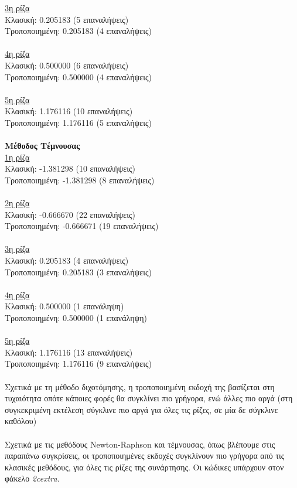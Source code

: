 \documentclass[a4paper, 14pt]{article}   %
\begin{document}
\underline{3η ρίζα}\\
Κλασική: 0.205183 (5 επαναλήψεις)\\
Τροποποιημένη: 0.205183 (4 επαναλήψεις)\\\\
\underline{4η ρίζα}\\
Κλασική: 0.500000 (6 επαναλήψεις)\\
Τροποποιημένη: 0.500000 (4 επαναλήψεις)\\\\
\underline{5η ρίζα}\\
Κλασική: 1.176116 (10 επαναλήψεις)\\
Τροποποιημένη: 1.176116 (5 επαναλήψεις)\\\\
\textbf{Μέθοδος Τέμνουσας}\\
\underline{1η ρίζα}\\
Κλασική: -1.381298 (10 επαναλήψεις)\\
Τροποποιημένη: -1.381298 (8 επαναλήψεις)\\\\
\underline{2η ρίζα}\\
Κλασική: -0.666670 (22 επαναλήψεις)\\
Τροποποιημένη: -0.666671 (19 επαναλήψεις) \\\\
\underline{3η ρίζα}\\
Κλασική: 0.205183 (4 επαναλήψεις)\\
Τροποποιημένη: 0.205183 (3 επαναλήψεις)\\\\
\underline{4η ρίζα}\\
Κλασική: 0.500000 (1 επανάληψη)\\
Τροποποιημένη: 0.500000 (1 επανάληψη)\\\\
\underline{5η ρίζα}\\
Κλασική: 1.176116 (13 επαναλήψεις)\\
Τροποποιημένη: 1.176116 (9 επαναλήψεις)\\\\
Σχετικά με τη μέθοδο διχοτόμησης, η τροποποιημένη εκδοχή της βασίζεται στη τυχαιότητα οπότε κάποιες φορές θα συγκλίνει πιο γρήγορα, ενώ άλλες πιο αργά (στη συγκεκριμένη εκτέλεση σύγκλινε πιο αργά για όλες τις ρίζες, σε μία δε σύγκλινε καθόλου)\\\\
Σχετικά με τις μεθόδους Newton-Raphson και τέμνουσας, όπως βλέπουμε στις παραπάνω συγκρίσεις, οι τροποποιημένες εκδοχές συγκλίνουν πιο γρήγορα από τις κλασικές μεθόδους, για όλες τις ρίζες της συνάρτησης. Οι κώδικες υπάρχουν στον φάκελο \emph{2c\textunderscore extra}.
\end{document}
